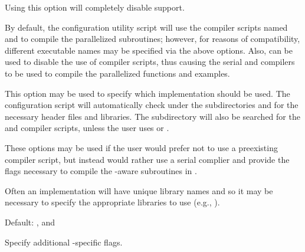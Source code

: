\begin{config}
  
\item {}

  Using this option will completely disable {\mpi} support.

\item {}
\item {}

  By default, the configuration utility script will use the {\mpi} compiler
  scripts named  and  to compile the parallelized
  {\sundials} subroutines; however, for reasons of compatibility, different
  executable names may be specified via the above options. Also, 
  can be used to disable the use of {\mpi} compiler scripts, thus causing
  the serial {\C} and {\F} compilers to be used to compile the parallelized
  {\sundials} functions and examples.

\item {}

  This option may be used to specify which {\mpi} implementation should be used.
  The {\sundials} configuration script will automatically check under the
  subdirectories  and  for the necessary
  header files and libraries. The subdirectory  will also be
  searched for the {\C} and {\F} {\mpi} compiler scripts, unless the user uses
   or .

\item {}
\item {}
\item {}

  These options may be used if the user would prefer not to use a preexisting
  {\mpi} compiler script, but instead would rather use a serial complier and
  provide the flags necessary to compile the {\mpi}-aware subroutines in
  {\sundials}.

  Often an {\mpi} implementation will have unique library names and so it may
  be necessary to specify the appropriate libraries to use (e.g.,
  ).

  Default: ,  and 

\item {}

  Specify additional {\mpi}-specific flags.

\end{config}


